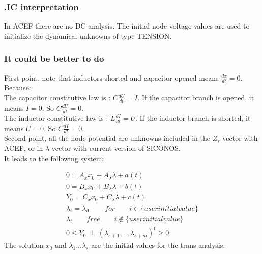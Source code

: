 \subsubsection{.IC interpretation}
In ACEF there are no DC analysis. The initial node voltage values are used to initialize the
dynamical unknowns of type TENSION.
\subsubsection{It could be better to do}
First point, note that inductors shorted and capacitor opened means $\frac{dx}{dt}=0$. Because:\\
The capacitor constitutive law is : $C\frac{dU}{dt}=I$. If the capacitor branch is opened, it means
$I=0$. So $C\frac{dU}{dt}=0$.\\
The inductor constitutive law is : $L\frac{dI}{dt}=U$. If the inductor branch is shorted, it means
$U=0$. So $C\frac{dI}{dt}=0$.\\
Second point, all the node potential are unknowns included in the $Z_{s}$ vector with ACEF, or in
$\lambda$ vector with current version of SICONOS.\\

It leads to the following system:

 \begin{eqnarray}
0=A_{x}x_{0} +A_{\lambda} \lambda +a(t)\\
0=B_{x}x_{0}+ B_{\lambda}\lambda + b(t)\\
Y_{0}=C_{x}x_{0}+C_{\lambda}\lambda + c(t) \\
\lambda_{i} = \lambda_{i0} \qquad for \qquad i \in \{ user initial value \}\\
\lambda_{i} \qquad free \qquad i \notin \{ user initial value \}\\
0 \leq Y_0 \, \perp \, (\lambda_{s+1},..,\lambda_{s+m})^{t} \geq 0
\end{eqnarray}
The solution $x_{0}$ and $\lambda_{1}...\lambda_{s}$ are the initial values for the trans analysis.
\newpage


